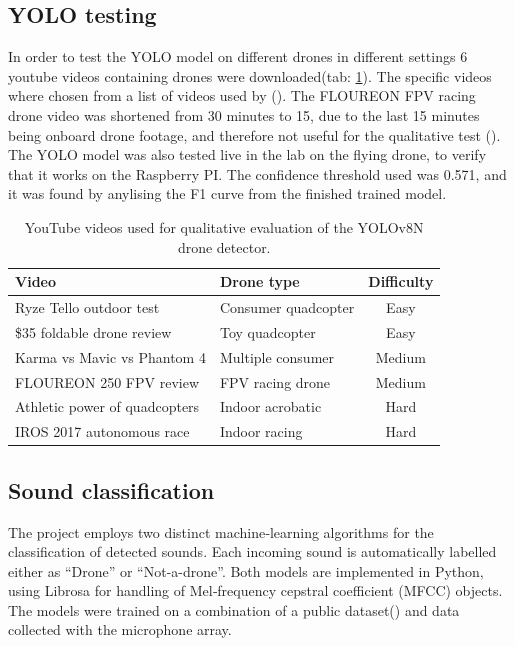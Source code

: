 \subsection{YOLO testing}

In order to test the YOLO model on different drones in different settings 6 youtube videos containing drones were downloaded(tab: \ref{tab:test_videos}). The specific videos where chosen from a list of videos used by (\cite{DroneDatasetFinal}). The FLOUREON FPV racing drone video was shortened from 30 minutes to 15, due to the last 15 minutes being onboard drone footage, and therefore not useful for the qualitative test (\cite{floureon2017}). 
The YOLO model was also tested live in the lab on the flying drone, to verify that it works on the Raspberry PI. The confidence threshold used was 0.571, and it was found by anylising the F1 curve from the finished trained model. 

\begin{table}[H]
    \centering
    \caption{YouTube videos used for qualitative evaluation of the YOLOv8N drone detector.}
    \label{tab:test_videos}
    \begin{tabular}{llc}
        \toprule
        \textbf{Video} & \textbf{Drone type} & \textbf{Difficulty} \\
        \midrule
        Ryze Tello outdoor test \cite{tello2019}        & Consumer quadcopter & Easy   \\
        \$35 foldable drone review \cite{foldable2018}  & Toy quadcopter      & Easy   \\
        Karma vs Mavic vs Phantom 4 \cite{gopro2017}    & Multiple consumer   & Medium \\
        FLOUREON 250 FPV review \cite{floureon2017}     & FPV racing drone    & Medium \\
        Athletic power of quadcopters \cite{dandrea2016}& Indoor acrobatic    & Hard   \\
        IROS 2017 autonomous race \cite{iros2017}       & Indoor racing       & Hard   \\
        \bottomrule
    \end{tabular}
\end{table}


\subsection{Sound classification}
The project employs two distinct machine‑learning algorithms for the classification of detected sounds. Each incoming sound is automatically labelled either as “Drone” or “Not-a-drone”. Both models are implemented in Python, using Librosa for handling of Mel‑frequency cepstral coefficient (MFCC) objects. The models were trained on a combination of a public dataset(\cite{AudioDatasett}) and data collected with the microphone array. 

